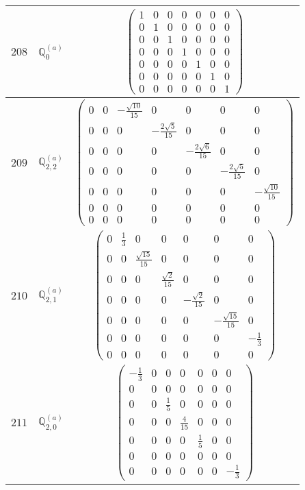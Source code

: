 \documentclass[fleqn,8pt,landscape]{jsarticle}
\begin{document}
\begin{center}
\begin{longtable}{ccc}
$ 208 $ & $ \mathbb{Q}_{0}^{(a)} $ & $ \begin{pmatrix} 1 & 0 & 0 & 0 & 0 & 0 & 0 \\ 0 & 1 & 0 & 0 & 0 & 0 & 0 \\ 0 & 0 & 1 & 0 & 0 & 0 & 0 \\ 0 & 0 & 0 & 1 & 0 & 0 & 0 \\ 0 & 0 & 0 & 0 & 1 & 0 & 0 \\ 0 & 0 & 0 & 0 & 0 & 1 & 0 \\ 0 & 0 & 0 & 0 & 0 & 0 & 1 \end{pmatrix} $ \\ \hline
$ 209 $ & $ \mathbb{Q}_{2,2}^{(a)} $ & $ \begin{pmatrix} 0 & 0 & - \frac{\sqrt{10}}{15} & 0 & 0 & 0 & 0 \\ 0 & 0 & 0 & - \frac{2 \sqrt{5}}{15} & 0 & 0 & 0 \\ 0 & 0 & 0 & 0 & - \frac{2 \sqrt{6}}{15} & 0 & 0 \\ 0 & 0 & 0 & 0 & 0 & - \frac{2 \sqrt{5}}{15} & 0 \\ 0 & 0 & 0 & 0 & 0 & 0 & - \frac{\sqrt{10}}{15} \\ 0 & 0 & 0 & 0 & 0 & 0 & 0 \\ 0 & 0 & 0 & 0 & 0 & 0 & 0 \end{pmatrix} $ \\ \hline
$ 210 $ & $ \mathbb{Q}_{2,1}^{(a)} $ & $ \begin{pmatrix} 0 & \frac{1}{3} & 0 & 0 & 0 & 0 & 0 \\ 0 & 0 & \frac{\sqrt{15}}{15} & 0 & 0 & 0 & 0 \\ 0 & 0 & 0 & \frac{\sqrt{2}}{15} & 0 & 0 & 0 \\ 0 & 0 & 0 & 0 & - \frac{\sqrt{2}}{15} & 0 & 0 \\ 0 & 0 & 0 & 0 & 0 & - \frac{\sqrt{15}}{15} & 0 \\ 0 & 0 & 0 & 0 & 0 & 0 & - \frac{1}{3} \\ 0 & 0 & 0 & 0 & 0 & 0 & 0 \end{pmatrix} $ \\ \hline
$ 211 $ & $ \mathbb{Q}_{2,0}^{(a)} $ & $ \begin{pmatrix} - \frac{1}{3} & 0 & 0 & 0 & 0 & 0 & 0 \\ 0 & 0 & 0 & 0 & 0 & 0 & 0 \\ 0 & 0 & \frac{1}{5} & 0 & 0 & 0 & 0 \\ 0 & 0 & 0 & \frac{4}{15} & 0 & 0 & 0 \\ 0 & 0 & 0 & 0 & \frac{1}{5} & 0 & 0 \\ 0 & 0 & 0 & 0 & 0 & 0 & 0 \\ 0 & 0 & 0 & 0 & 0 & 0 & - \frac{1}{3} \end{pmatrix} $ \\ \hline

\end{longtable}
\end{center}
\end{document}
